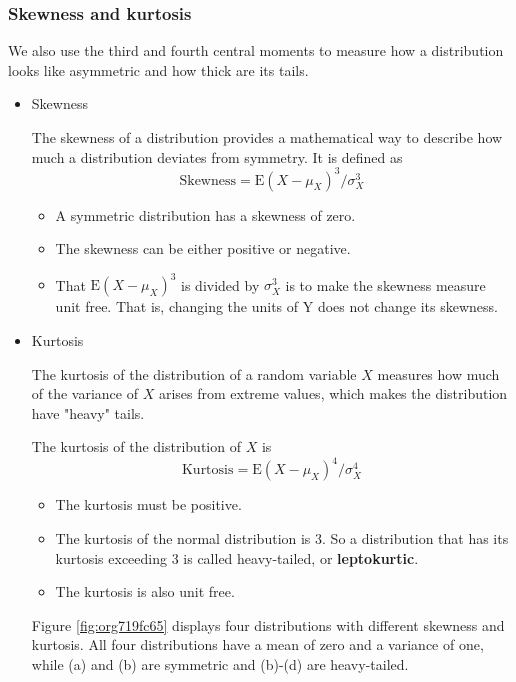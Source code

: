 \documentclass[a4paper,11pt]{article}
\begin{document}
\subsubsection*{Skewness and kurtosis}
\label{sec:org31e3d53}

We also use the third and fourth central moments to measure how a
distribution looks like asymmetric and how thick are its tails.

\begin{itemize}
\item Skewness
\label{sec:org133c897}

The skewness of a distribution provides a mathematical way to describe
how much a distribution deviates from symmetry. It is defined as
\[ \text{Skewness} =  \mathrm{E}(X - \mu_X)^{3}/\sigma_{X}^{3} \]

\begin{itemize}
\item A symmetric distribution has a skewness of zero.
\item The skewness can be either positive or negative.
\item That \(\mathrm{E}(X - \mu_X)^3\) is divided by \(\sigma^3_X\) is to make the
skewness measure unit free. That is, changing the units of Y does
not change its skewness.
\end{itemize}

\item Kurtosis
\label{sec:orgeb231a9}

The kurtosis of the distribution of a random variable \(X\) measures how
much of the variance of \(X\) arises from extreme values, which makes
the distribution have "heavy" tails.

The kurtosis of the distribution of \(X\) is
\[ \text{Kurtosis} = \mathrm{E}(X - \mu_X)^{4}/\sigma_{X}^{4} \]

\begin{itemize}
\item The kurtosis must be positive.
\item The kurtosis of the normal distribution is 3. So a distribution that
has its kurtosis exceeding 3 is called heavy-tailed, or
\textbf{leptokurtic}.
\item The kurtosis is also unit free.
\end{itemize}

Figure \ref{fig:org719fc65} displays four distributions with different
skewness and kurtosis. All four distributions have a mean of zero and
a variance of one, while (a) and (b) are symmetric and (b)-(d) are
heavy-tailed.


\end{itemize}
\end{document}
